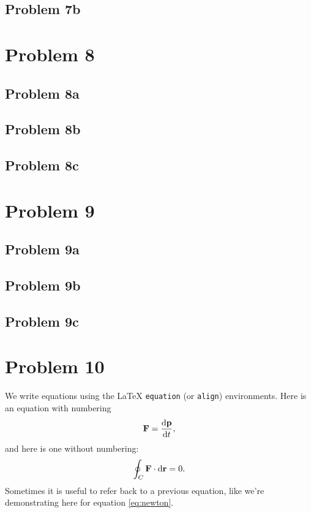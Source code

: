 \documentclass[english,notitlepage]{revtex4-1}  %
\begin{document}
\subsection*{Problem 7b}


\section*{Problem 8}
\subsection*{Problem 8a}

\subsection*{Problem 8b}

\subsection*{Problem 8c}


\section*{Problem 9}
\subsection*{Problem 9a}

\subsection*{Problem 9b}

\subsection*{Problem 9c}


\section*{Problem 10}
 

We write equations using the LaTeX \texttt{equation} (or \texttt{align}) environments. Here is an equation with numbering
\begin{equation}\label{eq:newton}
    \vb{F} = \dv{\vb{p}}{t},
\end{equation}
and here is one without numbering:
\begin{equation*}
\oint_C \vb{F}\cdot \dd \vb{r} = 0.
\end{equation*}
Sometimes it is useful to refer back to a previous equation, like we're demonstrating here for equation \ref{eq:newton}.
\end{document}
